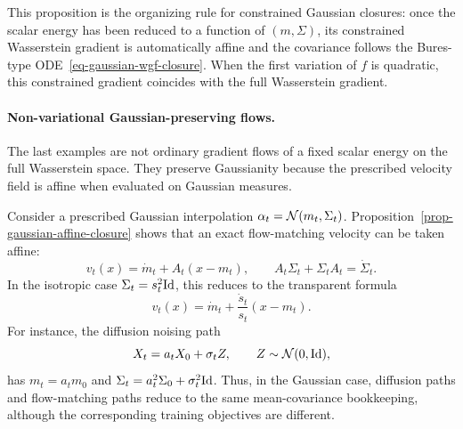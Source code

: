 This proposition is the organizing rule for constrained Gaussian closures: once the scalar energy has been reduced to a function of $(m,\Sigma)$, its constrained Wasserstein gradient is automatically affine and the covariance follows the Bures-type ODE~\eqref{eq-gaussian-wgf-closure}. When the first variation of $f$ is quadratic, this constrained gradient coincides with the full Wasserstein gradient.


\paragraph{Non-variational Gaussian-preserving flows.}

The last examples are not ordinary gradient flows of a fixed scalar energy on the full Wasserstein space. They preserve Gaussianity because the prescribed velocity field is affine when evaluated on Gaussian measures.

\begin{example}
	Consider a prescribed Gaussian interpolation $\alpha_t=\mathcal{N}(m_t,\Sigma_t)$. Proposition~\ref{prop-gaussian-affine-closure} shows that an exact flow-matching velocity can be taken affine:
	\[
		v_t(x)=\dot m_t+A_t(x-m_t),
		\qquad
		A_t\Sigma_t+\Sigma_t A_t=\dot\Sigma_t.
	\]
	In the isotropic case $\Sigma_t=s_t^2\mathrm{Id}$, this reduces to the transparent formula
	\[
		v_t(x)=\dot m_t+\frac{\dot s_t}{s_t}(x-m_t).
	\]
	For instance, the diffusion noising path
	\[
		X_t=a_tX_0+\sigma_t Z,\qquad Z\sim\mathcal{N}(0,\mathrm{Id}),
	\]
	has $m_t=a_tm_0$ and $\Sigma_t=a_t^2\Sigma_0+\sigma_t^2\mathrm{Id}$. Thus, in the Gaussian case, diffusion paths and flow-matching paths reduce to the same mean-covariance bookkeeping, although the corresponding training objectives are different.
\end{example}

